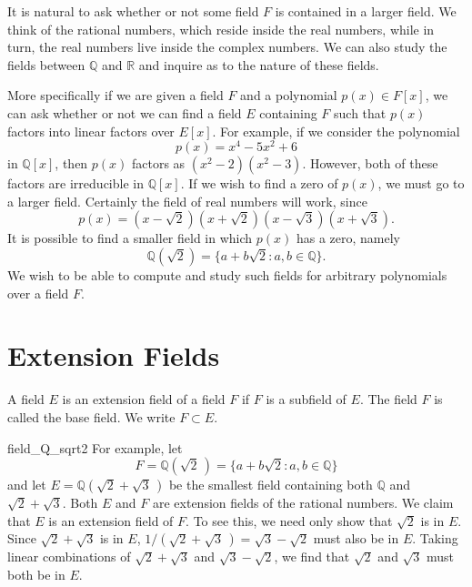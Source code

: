 
It is natural to ask whether or not some field $F$ is contained in a
larger field.  We think of the rational numbers, which reside inside
the real numbers, while in turn, the real numbers live inside the
complex numbers.  We can also study the fields between ${\mathbb Q}$ and
${\mathbb R}$ and inquire as to the nature of these fields.

 
More specifically if we are given a field $F$ and a polynomial $p(x)
\in F[x]$, we can ask whether or not we can find a field $E$
containing $F$ such that $p(x)$ factors into linear factors over
$E[x]$.  For example, if we consider the polynomial  
\[
p(x) =x^4 -5 x^2 + 6
\]
in ${\mathbb Q}[x]$,  then $p(x)$ factors as $(x^2 - 2)(x^2 - 3)$.
However, both of these factors are irreducible in ${\mathbb Q}[x]$.  If
we wish to find a zero of $p(x)$, we must go to a larger field.
Certainly the field of real numbers will work, since
\[
p(x) = (x - \sqrt{2} ) (x + \sqrt{2} )( x - \sqrt{3})(x + \sqrt{3}).
\]
It is possible to find a smaller field in which $p(x)$ has a zero,
namely 
\[
{\mathbb Q }( \sqrt{2} ) = \{ a + b \sqrt{2} : a, b \in {\mathbb Q} \}. 
\]
We wish to be able to compute and study such fields for arbitrary 
polynomials over a field $F$.  


\section{Extension Fields}

A field $E$ is an {\bfi extension
field\/} of a field $F$
if $F$ is a subfield of $E$. The field $F$ is called the {\bfi base 
field}.  We write $F \subset E$.

\begin{example}{field_Q_sqrt2}
For example, let 
\[
F = {\mathbb Q}( \sqrt{2}\,) = \{ a + b \sqrt{2} : a, b \in {\mathbb Q} \}
\]
and
let
$E =  {\mathbb Q }( \sqrt{2} +  \sqrt{3}\,)$ be the smallest field
containing both ${\mathbb Q}$ and $\sqrt{2} + \sqrt{3}$. Both $E$ and $F$
are extension fields of the rational numbers. We claim that $E$ is an
extension field of $F$. To see this, we need only show that $\sqrt{2}$
is in $E$. Since $\sqrt{2} + \sqrt{3}$ is in $E$, $1 / (\sqrt{2} +
\sqrt{3}\,) = \sqrt{3} - \sqrt{2}$ must also be in $E$. Taking linear
combinations of $\sqrt{2} + \sqrt{3}$ and $\sqrt{3} - \sqrt{2}$, we
find that $\sqrt{2}$ and $\sqrt{3}$ must both be in $E$.
\end{example}


